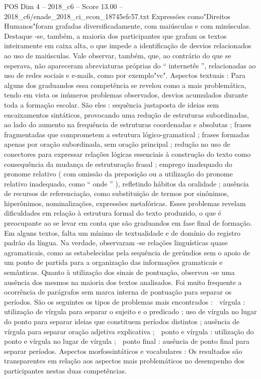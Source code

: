 \begin{textsample}{POS Dim 4 – 2018\_c6 – Score 13.00 – 2018\_c6/enade\_2018\_ci\_econ\_18745efc57.txt}
Expressões como"Direitos Humanos"foram grafadas diversificadamente, com maiúsculas e com minúsculas.
Destaque -se, também, a maioria dos participantes que grafam os textos inteiramente em caixa alta, o que impede a identificação de desvios relacionados ao uso de maiúsculas.
Vale observar, também, que, ao contrário do que se esperava, não apareceram abreviaturas próprias do “ internetês ”, relacionadas ao uso de redes sociais e e-mails, como por exemplo"vc".
Aspectos textuais : Para alguns dos graduandos essa competência se revelou como a mais problemática, tendo em vista os inúmeros problemas observados, desvios acumulados durante toda a formação escolar.
São eles : sequência justaposta de ideias sem encaixamentos sintáticos, provocando uma redução de estruturas subordinadas, ao lado do aumento na frequência de estruturas coordenadas e absolutas ; frases fragmentadas que comprometem a estrutura lógico-gramatical ; frases formadas apenas por oração subordinada, sem oração principal ; redução no uso de conectores para expressar relações lógicas essenciais à construção do texto como consequência da mudança de estruturação frasal ; emprego inadequado do pronome relativo ( com omissão da preposição ou a utilização do pronome relativo inadequado, como “ onde ” ), refletindo hábitos da oralidade ; ausência de recursos de referenciação, como substituição de termos por sinônimos, hiperônimos, nominalizações, expressões metafóricas.
Esses problemas revelam dificuldades em relação à estrutura formal do texto produzido, o que é preocupante ao se levar em conta que são graduandos em fase final de formação.
Em alguns textos, falta um mínimo de textualidade e de domínio do registro padrão da língua.
Na verdade, observaram -se relações linguísticas quase agramaticais, como as estabelecidas pela sequência de gerúndios sem o apoio de um ponto de partida para a organização das informações gramaticais e semânticas.
Quanto à utilização dos sinais de pontuação, observou -se uma ausência dos mesmos na maioria dos textos analisados.
Foi muito frequente a ocorrência de parágrafos sem marca interna de pontuação para separar os períodos.
São os seguintes os tipos de problemas mais encontrados :  vírgula : utilização de vírgula para separar o sujeito e o predicado ; uso de vírgula no lugar do ponto para separar ideias que constituem períodos distintos ; ausência de vírgula para separar oração adjetiva explicativa ;  ponto e vírgula : utilização do ponto e vírgula no lugar de vírgula ;  ponto final : ausência de ponto final para separar períodos.
Aspectos morfossintáticos e vocabulares : Os resultados são transparentes em relação aos aspectos mais problemáticos no desempenho dos participantes nestas duas competências.

\end{textsample}
